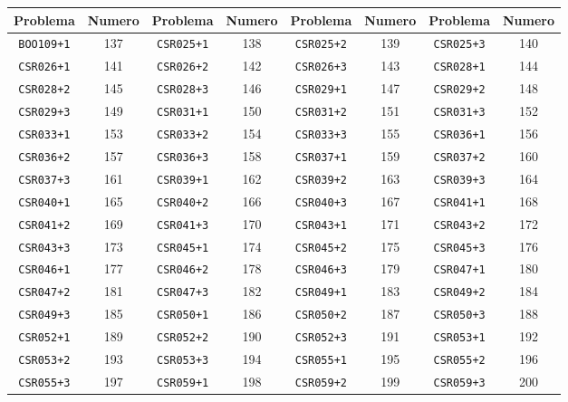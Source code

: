 \documentclass[./main.tex]{subfiles}
\begin{document}
    


\begin{table}[H]
\begin{tabular}{|c|c|c|c|c|c|c|c|}
\hline
Problema & Numero & Problema & Numero & Problema & Numero & Problema & Numero \\
\hline
\texttt{BOO109+1} & 137 & \texttt{CSR025+1} & 138 & \texttt{CSR025+2} & 139 & \texttt{CSR025+3} & 140\\
\hline
\texttt{CSR026+1} & 141 & \texttt{CSR026+2} & 142 & \texttt{CSR026+3} & 143 & \texttt{CSR028+1} & 144\\
\hline
\texttt{CSR028+2} & 145 & \texttt{CSR028+3} & 146 & \texttt{CSR029+1} & 147 & \texttt{CSR029+2} & 148\\
\hline
\texttt{CSR029+3} & 149 & \texttt{CSR031+1} & 150 & \texttt{CSR031+2} & 151 & \texttt{CSR031+3} & 152\\
\hline
\texttt{CSR033+1} & 153 & \texttt{CSR033+2} & 154 & \texttt{CSR033+3} & 155 & \texttt{CSR036+1} & 156\\
\hline
\texttt{CSR036+2} & 157 & \texttt{CSR036+3} & 158 & \texttt{CSR037+1} & 159 & \texttt{CSR037+2} & 160\\
\hline
\texttt{CSR037+3} & 161 & \texttt{CSR039+1} & 162 & \texttt{CSR039+2} & 163 & \texttt{CSR039+3} & 164\\
\hline
\texttt{CSR040+1} & 165 & \texttt{CSR040+2} & 166 & \texttt{CSR040+3} & 167 & \texttt{CSR041+1} & 168\\
\hline
\texttt{CSR041+2} & 169 & \texttt{CSR041+3} & 170 & \texttt{CSR043+1} & 171 & \texttt{CSR043+2} & 172\\
\hline
\texttt{CSR043+3} & 173 & \texttt{CSR045+1} & 174 & \texttt{CSR045+2} & 175 & \texttt{CSR045+3} & 176\\
\hline
\texttt{CSR046+1} & 177 & \texttt{CSR046+2} & 178 & \texttt{CSR046+3} & 179 & \texttt{CSR047+1} & 180\\
\hline
\texttt{CSR047+2} & 181 & \texttt{CSR047+3} & 182 & \texttt{CSR049+1} & 183 & \texttt{CSR049+2} & 184\\
\hline
\texttt{CSR049+3} & 185 & \texttt{CSR050+1} & 186 & \texttt{CSR050+2} & 187 & \texttt{CSR050+3} & 188\\
\hline
\texttt{CSR052+1} & 189 & \texttt{CSR052+2} & 190 & \texttt{CSR052+3} & 191 & \texttt{CSR053+1} & 192\\
\hline
\texttt{CSR053+2} & 193 & \texttt{CSR053+3} & 194 & \texttt{CSR055+1} & 195 & \texttt{CSR055+2} & 196\\
\hline
\texttt{CSR055+3} & 197 & \texttt{CSR059+1} & 198 & \texttt{CSR059+2} & 199 & \texttt{CSR059+3} & 200\\

\end{tabular}
\end{table}
\end{document}
